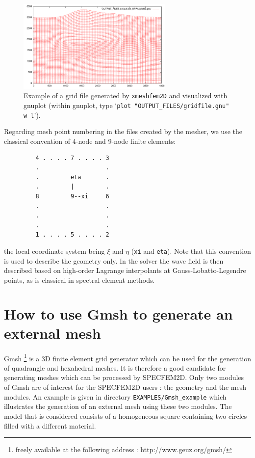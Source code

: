 \begin{figure}[htbp]
\centering
\includegraphics[width=3in]{figures/example-gridfile.pdf}
\caption{Example of a grid file generated by \texttt{xmeshfem2D} and visualized with gnuplot
(within gnuplot, type `\texttt{plot "OUTPUT\_FILES/gridfile.gnu" w l}').}
\label{fig:example.mesh}
\end{figure}

Regarding mesh point numbering in the files created by the mesher, we use the classical convention of 4-node and 9-node finite elements:
%
\begin{verbatim}
         4 . . . . 7 . . . . 3
         .                   .
         .         eta       .
         .         |         .
         8         9--xi     6
         .                   .
         .                   .
         .                   .
         1 . . . . 5 . . . . 2
\end{verbatim}
%
the local coordinate system being $\xi$ and $\eta$ (\texttt{xi} and \texttt{eta}).
Note that this convention is used to describe the geometry only. In the solver the wave field is then described based on high-order Lagrange interpolants
at Gauss-Lobatto-Legendre points, as is classical in spectral-element methods.

\section{How to use Gmsh to generate an external mesh}

Gmsh%
\footnote{freely available at the following address : http://www.geuz.org/gmsh/%
} is a 3D finite element grid generator which can be used for the generation
of quadrangle and hexahedral meshes. It is therefore a good candidate
for generating meshes which can be processed by SPECFEM2D. Only two
modules of Gmsh are of interest for the SPECFEM2D users : the geometry
and the mesh modules. An example is given in directory \texttt{EXAMPLES/Gmsh\_example}
which illustrates the generation of an external mesh using these two
modules. The model that is considered consists of a homogeneous
square containing two circles filled with a different material.

